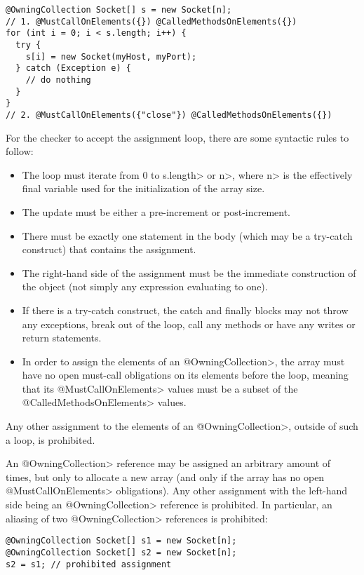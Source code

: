 \begin{verbatim}
@OwningCollection Socket[] s = new Socket[n];
// 1. @MustCallOnElements({}) @CalledMethodsOnElements({})
for (int i = 0; i < s.length; i++) {
  try {
    s[i] = new Socket(myHost, myPort);
  } catch (Exception e) {
    // do nothing
  }
}
// 2. @MustCallOnElements({"close"}) @CalledMethodsOnElements({})
\end{verbatim}
For the checker to accept the assignment loop, there are some syntactic rules to follow:
\begin{itemize}
  \item The loop must iterate from 0 to \<s.length> or \<n>, where \<n> is the effectively final variable used for the initialization of the array size.
  \item The update must be either a pre-increment or post-increment.
  \item There must be exactly one statement in the body (which may be a try-catch construct) that contains the assignment.
  \item The right-hand side of the assignment must be the immediate construction of the object (not simply any expression evaluating to one).
  \item If there is a try-catch construct, the catch and finally blocks may not throw any exceptions, break out of the loop, call any methods or have any writes or return statements.
  \item In order to assign the elements of an \<@OwningCollection>, the array must have no open must-call obligations on its elements before the loop, meaning that its \<@MustCallOnElements> values must be a subset of the \<@CalledMethodsOnElements> values.
\end{itemize}

\noindent Any other assignment to the elements of an \<@OwningCollection>, outside of such a loop, is prohibited.

\noindent An \<@OwningCollection> reference may be assigned an arbitrary amount of times, but only to allocate a new array (and only if the array has no open \<@MustCallOnElements> obligations). Any other assignment with the left-hand side being an \<@OwningCollection> reference is prohibited. In particular, an aliasing of two \<@OwningCollection> references is prohibited:

\begin{verbatim}
@OwningCollection Socket[] s1 = new Socket[n];
@OwningCollection Socket[] s2 = new Socket[n];
s2 = s1; // prohibited assignment
\end{verbatim}

